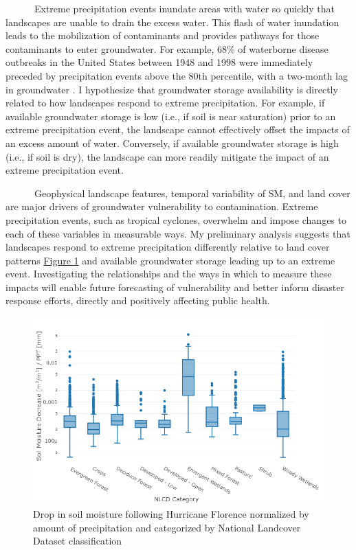 \documentclass[
]{book}
\begin{document}
~~~~~~Extreme precipitation events inundate areas with water so quickly that landscapes are unable to drain the excess water. This flash of water inundation leads to the mobilization of contaminants and provides pathways for those contaminants to enter groundwater. For example, 68\% of waterborne disease outbreaks in the United States between 1948 and 1998 were immediately preceded by precipitation events above the 80th percentile, with a two-month lag in groundwater \citep{curriero2001}. I hypothesize that groundwater storage availability is directly related to how landscapes respond to extreme precipitation. For example, if available groundwater storage is low (i.e., if soil is near saturation) prior to an extreme precipitation event, the landscape cannot effectively offset the impacts of an excess amount of water. Conversely, if available groundwater storage is high (i.e., if soil is dry), the landscape can more readily mitigate the impact of an extreme precipitation event.

~~~~~~Geophysical landscape features, temporal variability of SM, and land cover are major drivers of groundwater vulnerability to contamination. Extreme precipitation events, such as tropical cyclones, overwhelm and impose changes to each of these variables in measurable ways. My preliminary analysis suggests that landscapes respond to extreme precipitation differently relative to land cover patterns \protect\hyperlink{fig:boxPlot}{Figure \ref{fig:boxPlot}} and available groundwater storage leading up to an extreme event. Investigating the relationships and the ways in which to measure these impacts will enable future forecasting of vulnerability and better inform disaster response efforts, directly and positively affecting public health.

\begin{figure}
\includegraphics[width=1\linewidth]{img/boxplot} \caption{Drop in soil moisture following Hurricane Florence normalized by amount of precipitation and categorized by National Landcover Dataset classification}\label{fig:boxPlot}
\end{figure}
\end{document}
